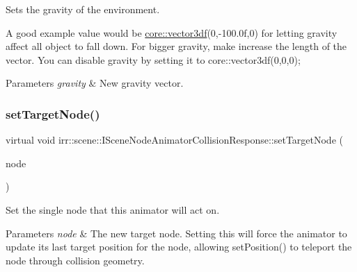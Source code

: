 Sets the gravity of the environment. 

A good example value would be \hyperlink{namespaceirr_1_1core_ae6e2b2a6c552833ebbd5b7463d03586b}{core\+::vector3df}(0,-\/100.\+0f,0) for letting gravity affect all object to fall down. For bigger gravity, make increase the length of the vector. You can disable gravity by setting it to core\+::vector3df(0,0,0); 
\begin{DoxyParams}{Parameters}
{\em gravity} & New gravity vector. \\
\hline
\end{DoxyParams}
\mbox{\label{classirr_1_1scene_1_1ISceneNodeAnimatorCollisionResponse_a5b291ba9249c451779f76ab2154aa3c2}} 
\subsubsection{\texorpdfstring{set\+Target\+Node()}{setTargetNode()}\hspace{0.1cm}{\footnotesize\ttfamily [1/2]}}
{\footnotesize\ttfamily virtual void irr\+::scene\+::\+I\+Scene\+Node\+Animator\+Collision\+Response\+::set\+Target\+Node (\begin{DoxyParamCaption}\item[{\hyperlink{classirr_1_1scene_1_1ISceneNode}{I\+Scene\+Node} $\ast$}]{node }\end{DoxyParamCaption})\hspace{0.3cm}{\ttfamily [pure virtual]}}



Set the single node that this animator will act on. 


\begin{DoxyParams}{Parameters}
{\em node} & The new target node. Setting this will force the animator to update its last target position for the node, allowing set\+Position() to teleport the node through collision geometry. \\
\hline
\end{DoxyParams}
\mbox{\label{classirr_1_1scene_1_1ISceneNodeAnimatorCollisionResponse_a5b291ba9249c451779f76ab2154aa3c2}} 
